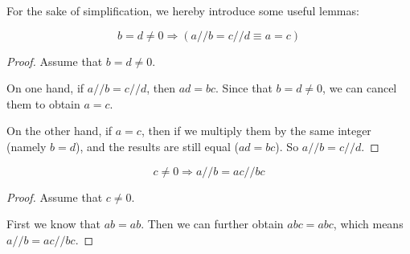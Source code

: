 For the sake of simplification, we hereby introduce some useful lemmas:
\begin{lem} \label{lem4.2.1}
\[
b=d\neq 0 \Longrightarrow (a//b = c//d \equiv a=c)
\]
\end{lem}
\begin{proof}
Assume that $b=d\neq 0$.

On one hand, if $a//b=c//d$, then $ad=bc$. Since that $b=d \neq 0$, we can cancel them to obtain $a=c$.

On the other hand, if $a=c$, then if we multiply them by the same integer (namely $b=d$), and the 
results are still equal ($ad=bc$). So $a//b=c//d$.
\end{proof}
\begin{lem} \label{lem4.2.2}
\[
c \neq 0 \Longrightarrow a//b=ac//bc
\]
\end{lem}
\begin{proof}
Assume that $c\neq 0$.

First we know that $ab=ab$. Then we can further obtain $abc=abc$, which 
means $a//b=ac//bc$.
\end{proof}

